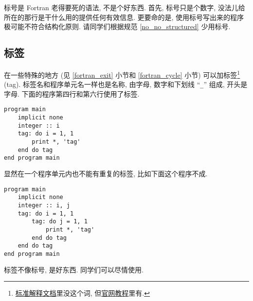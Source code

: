 标号是 Fortran 老得要死的语法, 不是个好东西. 首先, 标号只是个数字, 没法儿给所在的那行是干什么用的提供任何有效信息. 更要命的是, 使用标号写出来的程序极可能不符合结构化原则. 请同学们根据规范 \ref{no_no_structured} 少用标号.

\subsection{标签}

在一些特殊的地方 (见 \ref{fortran_exit} 小节和 \ref{fortran_cycle} 小节) 可以加标签\footnote{\href{https://j3-fortran.org/doc/year/24/24-007.pdf}{标准解释文档}里没这个词, 但\href{https://fortran-lang.org/learn/quickstart/}{官网教程}里有.} (tag). 标签名和程序单元名一样也是名称, 由字母, 数字和下划线 ``\texttt{\_{}}'' 组成, 开头是字母. 下面的程序第四行和第六行使用了标签.
\begin{lstlisting}
program main
    implicit none
    integer :: i
    tag: do i = 1, 1
        print *, 'tag'
    end do tag
end program main
\end{lstlisting}

显然在一个程序单元内也不能有重复的标签, 比如下面这个程序不成.
\begin{lstlisting}
program main
    implicit none
    integer :: i, j
    tag: do i = 1, 1
        tag: do j = 1, 1
            print *, 'tag'
        end do tag
    end do tag
end program main
\end{lstlisting}

标签不像标号, 是好东西. 同学们可以尽情使用.
